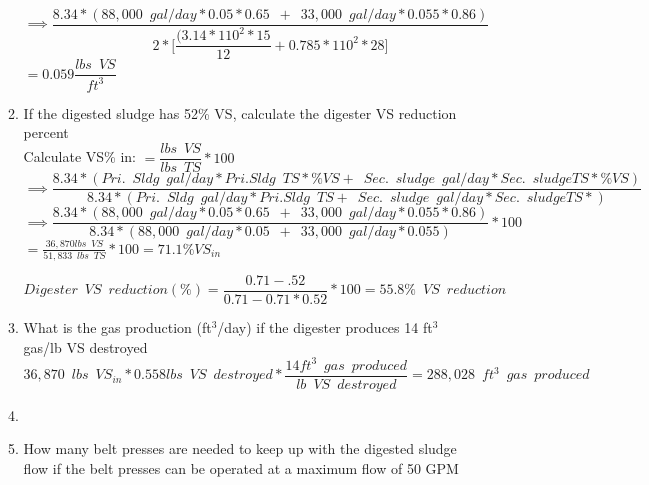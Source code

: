 \begin{enumerate}
\begin{enumerate}
$\implies \dfrac{8.34*(88,000 \enspace gal/day *0.05*0.65 \enspace+ \enspace 33,000 \enspace gal/day *0.055*0.86)}{2*\Big[\dfrac{(3.14*110^2*15}{12}+0.785*110^2*28\Big]}$
 \vspace{0.4cm}
$=\boxed{0.059 \dfrac{lbs \enspace VS}{ft^3}}$
\vspace{0.4cm}
\item If the digested sludge has 52\% VS, calculate the digester VS reduction percent\\
\vspace{0.4cm}
Calculate VS\% in: $=\dfrac{lbs \enspace VS}{lbs \enspace TS}*100$\\
$\implies \dfrac{8.34*(Pri. \enspace Sldg \enspace gal/day *Pri. Sldg \enspace TS *\%VS + \enspace Sec. \enspace sludge \enspace gal/day *Sec. \enspace sludge TS *\%VS)}{8.34*(Pri. \enspace Sldg \enspace gal/day *Pri. Sldg \enspace TS  + \enspace Sec. \enspace sludge \enspace gal/day *Sec. \enspace sludge TS *)}$\\
 \vspace{0.4cm}
$\implies \dfrac{8.34*(88,000 \enspace gal/day *0.05*0.65 \enspace+ \enspace 33,000 \enspace gal/day *0.055*0.86)}{8.34*(88,000 \enspace gal/day *0.05\enspace+ \enspace 33,000 \enspace gal/day *0.055)}*100$\\
\vspace{0.4cm}
$=\frac{36,870 lbs \enspace VS}{51,833 \enspace lbs \enspace TS}*100=\boxed{71.1 \% VS_{in}}$

$
Digester \enspace VS \enspace reduction (\%)=
	\dfrac
	{0.71 - .52}
	{0.71 - 0.71 *0.52}
	*100=\boxed{55.8\% \enspace VS \enspace reduction}
$\\
\vspace{0.25cm}

\item What is the gas production (ft$^3$/day) if the digester produces 14 ft$^3$ gas/lb VS destroyed\\
$36,870 \enspace lbs \enspace VS_{in}*0.558 lbs\enspace VS \enspace destroyed*\dfrac{14ft^3 \enspace gas \enspace produced}{lb \enspace VS \enspace destroyed}=\boxed{288,028 \enspace ft^3 \enspace gas \enspace produced}$
\\
\vspace{0.4cm}
\item \item How many belt presses are needed to keep up with the digested sludge flow if the belt presses can be operated at a maximum flow of 50 GPM \\


\end{enumerate}
\end{enumerate}
